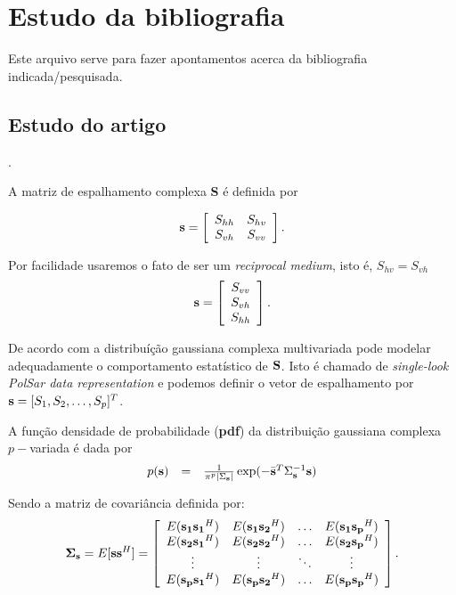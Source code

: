 \documentclass[10pt,a4paper]{article}
\begin{document}
\section{Estudo da bibliografia}

Este arquivo serve para fazer apontamentos acerca da bibliografia indicada/pesquisada.

\subsection{Estudo do artigo  \cite{lee94}}.

A matriz de espalhamento complexa {\bf S} é definida por

$$
{\bf s} = \left[
\begin{array}{cc}
	S_{hh}   & S_{hv}   \\
	S_{vh}   & S_{vv}   \\
\end{array}
\right].
$$

Por facilidade usaremos o fato de ser um {\it reciprocal medium}, isto é, $S_{hv}=S_{vh}$
$$
{\bf s} = \left[
\begin{array}{c}
	S_{vv}      \\
	S_{vh}     \\
	S_{hh}      \\
\end{array}
\right].
$$

De acordo com \cite{goodman1963} a distribuíção gaussiana complexa multivariada pode modelar adequadamente o comportamento estatístico de $\bf S$. Isto é chamado de {\it single-look PolSar data representation} e podemos definir o vetor de espalhamento por ${\bf s}=[S_1,S_2,\dots,S_p]^T$. 

A função densidade de probabilidade ({\bf pdf}) da distribuição gaussiana complexa $p-$variada é dada por
\begin{equation}\label{sec1eqn2}
\begin{array}{ccc}
	p({\bf s})&=&\frac{1}{\pi^p|\Sigma_{{\bf s}}|}\exp(-\bar{{\bf s}}^{T}\Sigma_{{\bf s}}^{-1}{\bf s})  \\
\end{array}
\end{equation}

Sendo a matriz de covariância definida por:
\begin{equation}\label{sec1eqn2}
	{\bf \Sigma_{{\bf s}}} = E[{\bf s}{\bf s}^H] = \left[
\begin{array}{cccc}
	E({\bf s_1}{\bf s_1}^H)  & E({\bf s_1}{\bf s_2}^H) &\hdots & E({\bf s_1}{\bf s_p}^H) \\
	E({\bf s_2}{\bf s_1}^H)  & E({\bf s_2}{\bf s_2}^H) &\hdots &E({\bf s_2}{\bf s_p}^H)\\
        \vdots&\vdots &\ddots &\vdots\\
	E({\bf s_p}{\bf s_1}^H)  & E({\bf s_p}{\bf s_2}^H) &\hdots &E({\bf s_p}{\bf s_p}^H)\\
\end{array}
\right].
\end{equation}
\end{document}

